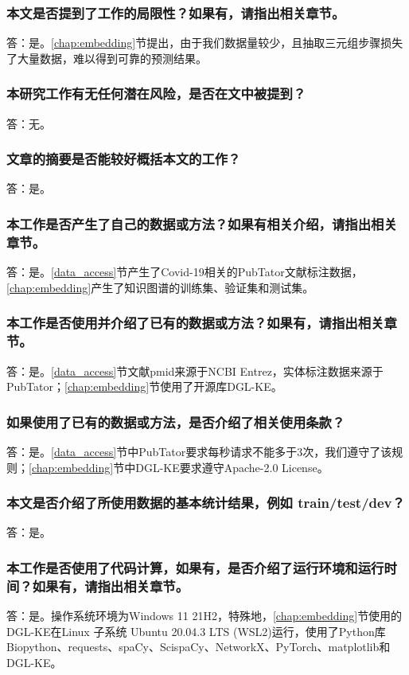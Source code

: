 \documentclass[twocolumn]{article}
\begin{document}
\subsubsection{本文是否提到了工作的局限性？如果有，请指出相关章节。}
答：是。\ref{chap:embedding}节提出，由于我们数据量较少，且抽取三元组步骤损失了大量数据，难以得到可靠的预测结果。
\subsubsection{本研究工作有无任何潜在风险，是否在文中被提到？}
答：无。
\subsubsection{文章的摘要是否能较好概括本文的工作？}
答：是。
\subsubsection{本工作是否产生了自己的数据或方法？如果有相关介绍，请指出相关章节。}
答：是。\ref{data_access}节产生了Covid-19相关的PubTator文献标注数据，\ref{chap:embedding}产生了知识图谱的训练集、验证集和测试集。
\subsubsection{本工作是否使用并介绍了已有的数据或方法？如果有，请指出相关章节。}
答：是。\ref{data_access}节文献pmid来源于NCBI Entrez，实体标注数据来源于PubTator；\ref{chap:embedding}节使用了开源库DGL-KE。
\subsubsection{如果使用了已有的数据或方法，是否介绍了相关使用条款？}
答：是。\ref{data_access}节中PubTator要求每秒请求不能多于3次，我们遵守了该规则；\ref{chap:embedding}节中DGL-KE要求遵守Apache-2.0 License。
\subsubsection{本文是否介绍了所使用数据的基本统计结果，例如 train/test/dev？}
答：是。
\subsubsection{本工作是否使用了代码计算，如果有，是否介绍了运行环境和运行时间？如果有，请指出相关章节。}
答：是。操作系统环境为Windows 11 21H2，特殊地，\ref{chap:embedding}节使用的DGL-KE在Linux 子系统 Ubuntu 20.04.3 LTS (WSL2)运行，使用了Python库Biopython、requests、spaCy、ScispaCy、NetworkX、PyTorch、matplotlib和DGL-KE。
\end{document}
